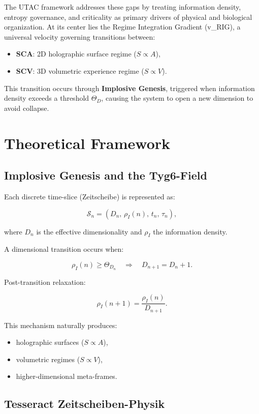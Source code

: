 \documentclass[11pt,a4paper]{article}
\begin{document}
The UTAC framework addresses these gaps by treating information density, entropy governance, and criticality as primary drivers of physical and biological organization. At its center lies the Regime Integration Gradient (v\_RIG), a universal velocity governing transitions between:

\begin{itemize}
\item \textbf{SCA}: 2D holographic surface regime ($S \propto A$),
\item \textbf{SCV}: 3D volumetric experience regime ($S \propto V$).
\end{itemize}

This transition occurs through \textbf{Implosive Genesis}, triggered when information density exceeds a threshold $\Theta_D$, causing the system to open a new dimension to avoid collapse.

\section{Theoretical Framework}

\subsection{Implosive Genesis and the Tyg6-Field}

Each discrete time-slice (Zeitscheibe) is represented as:


\[
\mathcal{S}_n = (D_n,\, \rho_I(n),\, t_n,\, \tau_n),
\]


where $D_n$ is the effective dimensionality and $\rho_I$ the information density.

A dimensional transition occurs when:


\[
\rho_I(n) \ge \Theta_{D_n} \quad \Rightarrow \quad D_{n+1} = D_n + 1.
\]



Post-transition relaxation:


\[
\rho_I(n+1) = \frac{\rho_I(n)}{D_{n+1}}.
\]



This mechanism naturally produces:
\begin{itemize}
\item holographic surfaces ($S \propto A$),
\item volumetric regimes ($S \propto V$),
\item higher-dimensional meta-frames.
\end{itemize}

\subsection{Tesseract Zeitscheiben-Physik}
\end{document}
